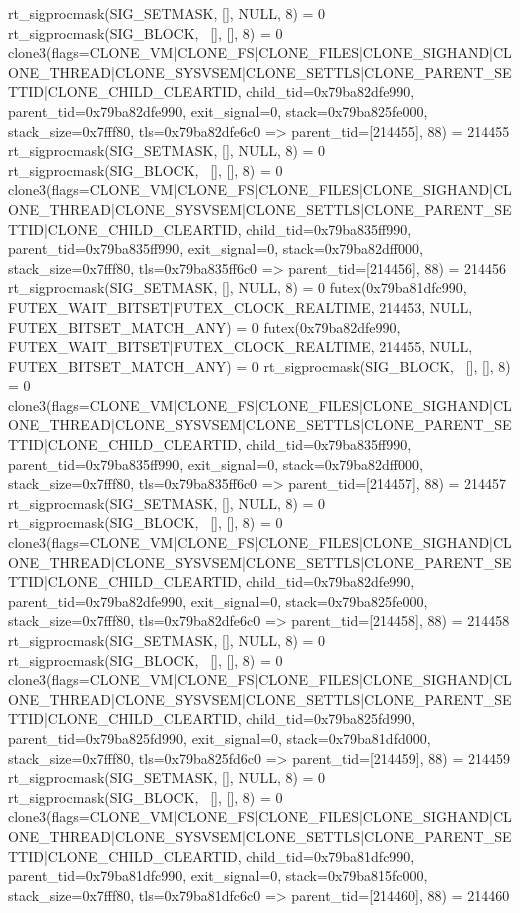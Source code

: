 \begin{breakableverbatim}
rt_sigprocmask(SIG_SETMASK, [], NULL, 8) = 0
rt_sigprocmask(SIG_BLOCK, ~[], [], 8)   = 0
clone3({flags=CLONE_VM|CLONE_FS|CLONE_FILES|CLONE_SIGHAND|CLONE_THREAD|CLONE_SYSVSEM|CLONE_SETTLS|CLONE_PARENT_SETTID|CLONE_CHILD_CLEARTID, child_tid=0x79ba82dfe990, parent_tid=0x79ba82dfe990, exit_signal=0, stack=0x79ba825fe000, stack_size=0x7fff80, tls=0x79ba82dfe6c0} => {parent_tid=[214455]}, 88) = 214455
rt_sigprocmask(SIG_SETMASK, [], NULL, 8) = 0
rt_sigprocmask(SIG_BLOCK, ~[], [], 8)   = 0
clone3({flags=CLONE_VM|CLONE_FS|CLONE_FILES|CLONE_SIGHAND|CLONE_THREAD|CLONE_SYSVSEM|CLONE_SETTLS|CLONE_PARENT_SETTID|CLONE_CHILD_CLEARTID, child_tid=0x79ba835ff990, parent_tid=0x79ba835ff990, exit_signal=0, stack=0x79ba82dff000, stack_size=0x7fff80, tls=0x79ba835ff6c0} => {parent_tid=[214456]}, 88) = 214456
rt_sigprocmask(SIG_SETMASK, [], NULL, 8) = 0
futex(0x79ba81dfc990, FUTEX_WAIT_BITSET|FUTEX_CLOCK_REALTIME, 214453, NULL, FUTEX_BITSET_MATCH_ANY) = 0
futex(0x79ba82dfe990, FUTEX_WAIT_BITSET|FUTEX_CLOCK_REALTIME, 214455, NULL, FUTEX_BITSET_MATCH_ANY) = 0
rt_sigprocmask(SIG_BLOCK, ~[], [], 8)   = 0
clone3({flags=CLONE_VM|CLONE_FS|CLONE_FILES|CLONE_SIGHAND|CLONE_THREAD|CLONE_SYSVSEM|CLONE_SETTLS|CLONE_PARENT_SETTID|CLONE_CHILD_CLEARTID, child_tid=0x79ba835ff990, parent_tid=0x79ba835ff990, exit_signal=0, stack=0x79ba82dff000, stack_size=0x7fff80, tls=0x79ba835ff6c0} => {parent_tid=[214457]}, 88) = 214457
rt_sigprocmask(SIG_SETMASK, [], NULL, 8) = 0
rt_sigprocmask(SIG_BLOCK, ~[], [], 8)   = 0
clone3({flags=CLONE_VM|CLONE_FS|CLONE_FILES|CLONE_SIGHAND|CLONE_THREAD|CLONE_SYSVSEM|CLONE_SETTLS|CLONE_PARENT_SETTID|CLONE_CHILD_CLEARTID, child_tid=0x79ba82dfe990, parent_tid=0x79ba82dfe990, exit_signal=0, stack=0x79ba825fe000, stack_size=0x7fff80, tls=0x79ba82dfe6c0} => {parent_tid=[214458]}, 88) = 214458
rt_sigprocmask(SIG_SETMASK, [], NULL, 8) = 0
rt_sigprocmask(SIG_BLOCK, ~[], [], 8)   = 0
clone3({flags=CLONE_VM|CLONE_FS|CLONE_FILES|CLONE_SIGHAND|CLONE_THREAD|CLONE_SYSVSEM|CLONE_SETTLS|CLONE_PARENT_SETTID|CLONE_CHILD_CLEARTID, child_tid=0x79ba825fd990, parent_tid=0x79ba825fd990, exit_signal=0, stack=0x79ba81dfd000, stack_size=0x7fff80, tls=0x79ba825fd6c0} => {parent_tid=[214459]}, 88) = 214459
rt_sigprocmask(SIG_SETMASK, [], NULL, 8) = 0
rt_sigprocmask(SIG_BLOCK, ~[], [], 8)   = 0
clone3({flags=CLONE_VM|CLONE_FS|CLONE_FILES|CLONE_SIGHAND|CLONE_THREAD|CLONE_SYSVSEM|CLONE_SETTLS|CLONE_PARENT_SETTID|CLONE_CHILD_CLEARTID, child_tid=0x79ba81dfc990, parent_tid=0x79ba81dfc990, exit_signal=0, stack=0x79ba815fc000, stack_size=0x7fff80, tls=0x79ba81dfc6c0} => {parent_tid=[214460]}, 88) = 214460

\end{breakableverbatim}
